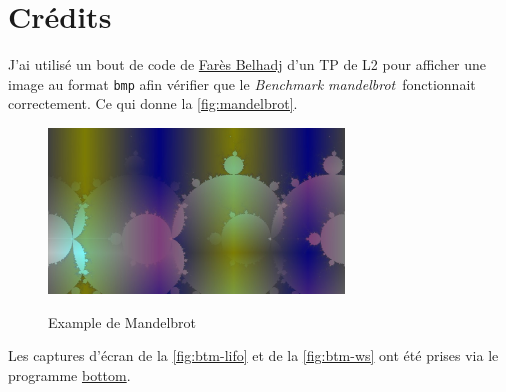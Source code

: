 \documentclass[a4paper]{article}
\def\btwo{\textit{Benchmark mandelbrot}}
\begin{document}
\clearpage
\appendix
\section{Crédits}

J'ai utilisé un bout de code de \href{https://expreg.org/amsi/C/}{Farès Belhadj}
d'un TP de L2 pour afficher une image au format \texttt{bmp} afin vérifier que
le \btwo~fonctionnait correctement. Ce qui donne la \autoref{fig:mandelbrot}.

\begin{figure}[H]
  \centering
  \includegraphics[alt={Fractale mandelbrot},width=0.7\textwidth]{imgs/mandelbrot.jpg}
  \caption{Example de Mandelbrot}
  \label{fig:mandelbrot}
\end{figure}

Les captures d'écran de la \autoref{fig:btm-lifo} et de la \autoref{fig:btm-ws}
ont été prises via le
programme \href{https://github.com/ClementTsang/bottom}{bottom}.
\end{document}
